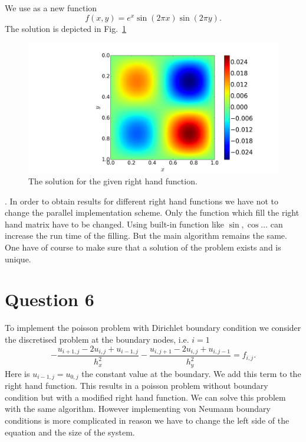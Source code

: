 We use as a new function
\begin{equation}
	f(x, y) = e^x \sin(2\pi x)\sin(2\pi y).
\end{equation}
The solution is depicted in Fig.~\ref{fig:func_plot}\begin{figure}[h] 
  \centering
     \includegraphics[width=\textwidth]{pic/func_plot.png}
  \caption{The solution for the given right hand function.}
  \label{fig:func_plot}
\end{figure}. In order to obtain results for different right hand functions we have not to change the parallel implementation scheme. Only the function which fill the right hand matrix have to be changed. Using built-in function like $\sin, \cos \ldots$ can increase the run time of the filling. But the main algorithm remains the same. One have of course to make sure that a solution of the problem exists and is unique.  

\section*{Question 6}

To implement the poisson problem with Dirichlet boundary condition we consider the discretised problem at the boundary nodes, i.e. $i = 1$
\begin{equation}
	-\frac{u_{i+1, j} - 2u_{i, j} + u_{i-1, j}}{h_x^2}  -\frac{u_{i, j+1} - 2u_{i, j} + u_{i, j-1}}{h_y^2} = f_{i,j}.
\end{equation}
Here is $u_{i-1, j} = u_{0, j}$ the constant value at the boundary. We add this term to the right hand function. This results in a poisson problem without boundary condition but with a modified right hand function. We can solve this problem with the same algorithm. However implementing von Neumann boundary conditions is more complicated in reason we have to change the left side of the equation and the size of the system.

